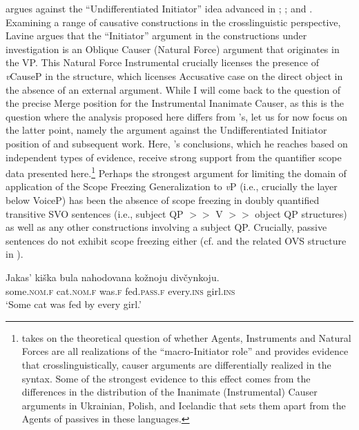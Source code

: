 \documentclass[output=paper,colorlinks,citecolor=brown]{langscibook}
\begin{document}
\citet{Lavine2022, Lavine2023} argues against the “Undifferentiated Initiator” idea advanced in \citet{ant:Ramchand2008}; \citet{Bruening2013}; \citet{Legate2014} and \citet{Wood2017}. Examining a range of causative constructions in the crosslinguistic perspective, Lavine argues that the “Initiator” argument in the constructions under investigation is an Oblique Causer (Natural Force) argument that originates in the VP. This Natural Force Instrumental crucially licenses the presence of \textit{v}CauseP in the structure, which licenses Accusative case on the direct object in the absence of an external argument. While I will come back to the question of the precise Merge position for the Instrumental Inanimate Causer, as this is the question where the analysis proposed here differs from \citeauthor{Lavine2023}'s, let us for now focus on the latter point, namely the argument against the Undifferentiated Initiator position of \citet{ant:Ramchand2008} and subsequent work. Here, \citeauthor{Lavine2023}'s conclusions, which he reaches based on independent types of evidence, receive strong support from the quantifier scope data presented here.\footnote{\textrm{\citet{Lavine2023} takes on the theoretical question of whether Agents, Instruments and Natural Forces are all realizations of the “macro-Initiator role” and provides evidence that crosslinguistically, causer arguments are differentially realized in the syntax. Some of the strongest evidence to this effect comes from the differences in the distribution of the Inanimate (Instrumental) Causer arguments in Ukrainian, Polish, and Icelandic that sets them apart from the Agents of passives in these languages.}} Perhaps the strongest argument for limiting the domain of application of the Scope Freezing Generalization to \textit{v}P (i.e., crucially the layer below VoiceP) has been the absence of scope freezing in doubly quantified transitive SVO sentences (i.e., subject QP $>>$ V $>>$ object QP structures) as well as any other constructions involving a subject QP. Crucially, passive sentences do not exhibit scope freezing either (cf.  and the related OVS structure in ).

\ea%
    \label{ex:antonyuk:33}
\gll           Jakas’ kiška     bula nahodovana     kožnoju divčynkoju.\\
  some.\textsc{nom.f} cat.\textsc{nom.f}   was.\textsc{f} fed.\textsc{pass.f} every.\textsc{ins} girl.\textsc{ins}\\
\glt `Some cat was fed by every girl.’
\end{document}
